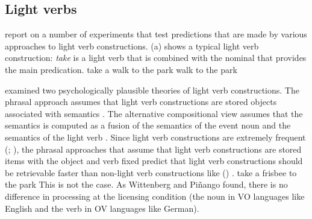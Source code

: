 \begin{exe}
\begin{xlist}[iv.]
\begin{exe}
\begin{xlist}[iv.]
\subsection{Light verbs}
\label{sec-psycho-lv}

\citet*{WJKP2014a} report on a number of experiments that test predictions that are made by
various approaches to light verb constructions. (a) shows a typical light verb construction:
\emph{take} is a light verb that is combined with the nominal that provides the main
predication. 
\eal
\ex take a walk to the park
\ex walk to the park
\zl

\citet{WP2011a} examined two psychologically plausible theories of light verb constructions.  The phrasal approach 
 assumes that light verb constructions are stored objects associated with semantics \citep{Goldberg2003a}.
The alternative compositional view assumes that the semantics is computed as a fusion of the
semantics of the event noun and the semantics of the
light verb \citep{Grimshaw97a-u,Butt2003a-u,Jackendoff2002a-u,CJ2005a,MuellerPersian,BPW2008a-u}.  
Since light verb constructions are extremely frequent (\citealp*{Pinango:2006qy};
\citealp[]{WP2011a}), the phrasal approaches that assume that
light verb constructions are stored items with the object and verb fixed predict that light verb
constructions should be retrievable faster than non-light verb constructions like () \citep[]{WP2011a}. 
\ea
take a frisbee to the park
\z
This is not the case. As Wittenberg and Piñango found, there is no difference in processing at the licensing
condition (the noun in VO languages like English and the verb in OV languages like German). 


\end{xlist}
\end{exe}
\end{xlist}
\end{exe}
